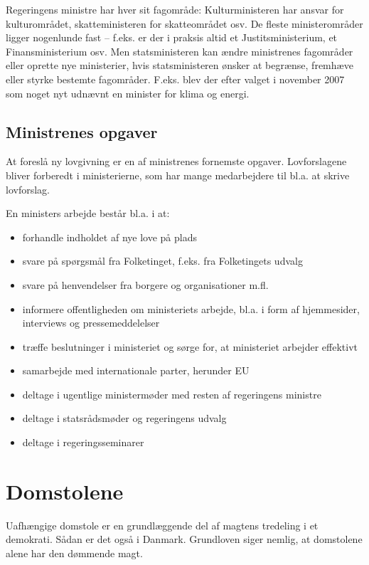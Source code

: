 \documentclass[]{book}
\providecommand{\tightlist}{%
  \setlength{\itemsep}{0pt}\setlength{\parskip}{0pt}}
\begin{document}
Regeringens ministre har hver sit fagområde: Kulturministeren har ansvar for kulturområdet, skatteministeren for skatteområdet osv.
De fleste ministerområder ligger nogenlunde fast -- f.eks. er der i praksis altid et Justitsministerium, et Finansministerium osv. Men statsministeren kan ændre ministrenes fagområder eller oprette nye ministerier, hvis statsministeren ønsker at begrænse, fremhæve eller styrke bestemte fagområder. F.eks. blev der efter valget i november 2007 som noget nyt udnævnt en minister for klima og energi.

\hypertarget{ministrenes-opgaver}{%
\subsection{Ministrenes opgaver}\label{ministrenes-opgaver}}

At foreslå ny lovgivning er en af ministrenes fornemste opgaver. Lovforslagene bliver forberedt i ministerierne, som har mange medarbejdere til bl.a. at skrive lovforslag.

En ministers arbejde består bl.a. i at:

\begin{itemize}
\tightlist
\item
  forhandle indholdet af nye love på plads
\item
  svare på spørgsmål fra Folketinget, f.eks. fra Folketingets udvalg
\item
  svare på henvendelser fra borgere og organisationer m.fl.
\item
  informere offentligheden om ministeriets arbejde, bl.a. i form af hjemmesider, interviews og pressemeddelelser
\item
  træffe beslutninger i ministeriet og sørge for, at ministeriet arbejder effektivt
\item
  samarbejde med internationale parter, herunder EU
\item
  deltage i ugentlige ministermøder med resten af regeringens ministre
\item
  deltage i statsrådsmøder og regeringens udvalg
\item
  deltage i regeringsseminarer
\end{itemize}

\hypertarget{domstolene}{%
\section{Domstolene}\label{domstolene}}

Uafhængige domstole er en grundlæggende del af magtens tredeling i et demokrati. Sådan er det også i Danmark. Grundloven siger nemlig, at domstolene alene har den dømmende magt.
\end{document}
